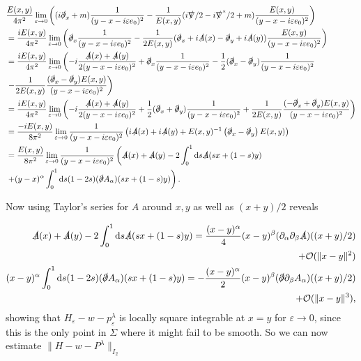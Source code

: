 \documentclass[a4paper,11pt]{article}
\begin{document}
\begin{align}\nonumber
&\frac{E(x,y)}{4\pi^2} \lim_{\varepsilon \rightarrow 0} \left( (i \slashed{\partial}_x +m) \frac{1}{(y-x-i \varepsilon e_0)^2} -\frac{1}{E(x,y)}(i \slashed{\nabla}/2 - i \slashed{\nabla}^*/2 +m) \frac{E(x,y)}{(y-x-i\varepsilon e_0)^2}\right)\\\nonumber
&=\frac{iE(x,y)}{4\pi^2} \lim_{\varepsilon \rightarrow 0} \left( \slashed{\partial}_x \frac{1}{(y-x-i \varepsilon e_0)^2} -\frac{1}{2E(x,y)}(\slashed{\partial}_x + i \slashed{A}(x) - \slashed{\partial}_y + i \slashed{A}(y) ) \frac{E(x,y)}{(y-x-i\varepsilon e_0)^2}\right)\\\nonumber
&=\frac{iE(x,y)}{4\pi^2} \lim_{\varepsilon \rightarrow 0} \left(-i\frac{\slashed{A}(x) + \slashed{A}(y)}{2 (y-x-i\varepsilon e_0)^2} + \slashed{\partial}_x \frac{1}{(y-x-i \varepsilon e_0)^2} -\frac{1}{2}(\slashed{\partial}_x- \slashed{\partial}_y ) \frac{1}{(y-x-i\varepsilon e_0)^2}\right.\\\nonumber
&\left.-\frac{1}{2E(x,y)} \frac{(\slashed{\partial}_x- \slashed{\partial}_y )E(x,y)}{(y-x-i\varepsilon e_0)^2}\right)\\\nonumber
&=\frac{iE(x,y)}{4\pi^2} \lim_{\varepsilon \rightarrow 0} \left(-i\frac{\slashed{A}(x) + \slashed{A}(y)}{2 (y-x-i\varepsilon e_0)^2} +\frac{1}{2}(\slashed{\partial}_x+ \slashed{\partial}_y ) \frac{1}{(y-x-i\varepsilon e_0)^2}
+\frac{1}{2E(x,y)} \frac{(-\slashed{\partial}_x+ \slashed{\partial}_y )E(x,y)}{(y-x-i\varepsilon e_0)^2}\right)\\\nonumber
&=\frac{-iE(x,y)}{8\pi^2} \lim_{\varepsilon \rightarrow 0} \frac{1}{(y-x-i\varepsilon e_0)^2} \left(i\slashed{A}(x) + i\slashed{A}(y)
+E(x,y)^{-1} \left( \slashed{\partial}_x- \slashed{\partial}_y\right) E(x,y) \right)\\\nonumber
&=\frac{E(x,y)}{8\pi^2} \lim_{\varepsilon \rightarrow 0} \frac{1}{(y-x-i\varepsilon e_0)^2} \left(\slashed{A}(x) + \slashed{A}(y)
-  2 \int_0^1 \mathrm{d}s \slashed{A}(s x + (1-s)y)  \right.\\\nonumber
&\left.+(y-x)^\alpha \int_0^1 \mathrm{d}s (1-2s) (\slashed{\partial}A_\alpha)(sx+(1-s)y)   \right).
\end{align}

Now using Taylor's series for \(A\) around \(x,y\) as well as \((x+y)/2\) reveals 

\begin{align}\nonumber
\slashed{A}(x) + \slashed{A}(y)- 2 \int_0^1 \mathrm{d}s \slashed{A}(s x + (1-s)y) = \frac{(x-y)^\alpha}{4} (x-y)^\beta (\partial_\alpha \partial_\beta \slashed{A})((x+y)/2) \\\label{estimate1}
+ \mathcal{O}(\|x-y\|^2)\\\nonumber
(x-y)^\alpha \int_0^1 \mathrm{d}s (1-2s) (\slashed{\partial}A_\alpha)(sx+(1-s)y)=
 -\frac{(x-y)^\alpha}{2}(x-y)^\beta  (\slashed{\partial}\partial_\beta A_\alpha)((x+y)/2) \\\label{estimate2}
 + \mathcal{O}(\|x-y\|^3),
\end{align}
showing that \(H_\varepsilon-w-p^\lambda_{\varepsilon}\) is locally square integrable at \(x=y\) for \(\varepsilon \rightarrow 0\), since this is the only point in \(\Sigma\) 
where it might fail to be smooth. So we can now estimate \(\|H-w-P^\lambda\|_{I_2}\)
\end{document}
